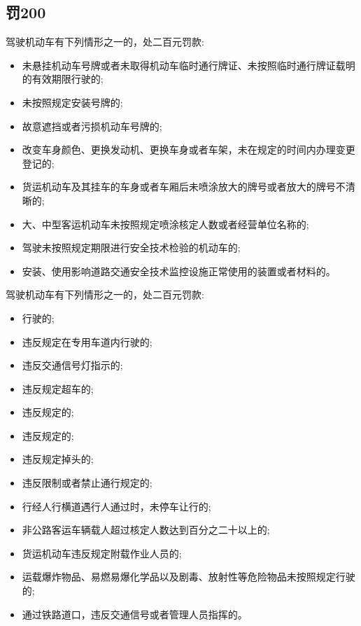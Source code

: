 \subsection{罚200}

\noindent 驾驶机动车有下列情形之一的，处二百元罚款:

\begin{itemize}
    \item 未悬挂机动车号牌或者未取得机动车临时通行牌证、未按照临时通行牌证载明的有效期限行驶的;
    \item 未按照规定安装号牌的;
    \item 故意遮挡或者污损机动车号牌的;
    \item 改变车身颜色、更换发动机、更换车身或者车架，未在规定的时间内办理变更登记的;
    \item 货运机动车及其挂车的车身或者车厢后未喷涂放大的牌号或者放大的牌号不清晰的;
    \item 大、中型客运机动车未按照规定喷涂核定人数或者经营单位名称的;
    \item 驾驶未按照规定期限进行安全技术检验的机动车的;
    \item 安装、使用影响道路交通安全技术监控设施正常使用的装置或者材料的。
\end{itemize}

\noindent 驾驶机动车有下列情形之一的，处二百元罚款:

\begin{itemize}
    \item {}行驶的;
    \item 违反规定在专用车道内行驶的;
    \item 违反交通信号灯指示的;
    \item 违反规定超车的;
    \item 违反规定的;
    \item 违反规定的;
    \item 违反规定掉头的;
    \item 违反限制或者禁止通行规定的;
    \item 行经人行横道遇行人通过时，未停车让行的;
    \item 非公路客运车辆载人超过核定人数达到百分之二十以上的;
    \item 货运机动车违反规定附载作业人员的;
    \item 运载爆炸物品、易燃易爆化学品以及剧毒、放射性等危险物品未按照规定行驶的;
    \item 通过铁路道口，违反交通信号或者管理人员指挥的。
\end{itemize}

